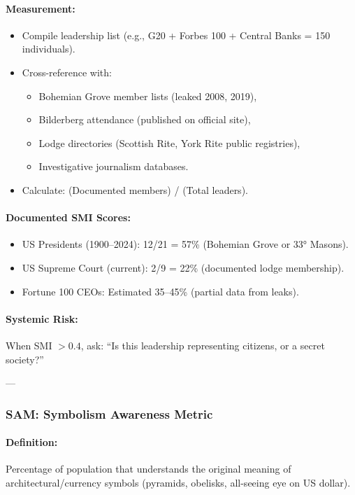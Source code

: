 \documentclass[11pt,a4paper]{article}
\theoremstyle{definition}
\theoremstyle{remark}
\begin{document}
\paragraph{Measurement:}
\begin{itemize}
\item Compile leadership list (e.g., G20 + Forbes 100 + Central Banks = 150 individuals).
\item Cross-reference with:
  \begin{itemize}
  \item Bohemian Grove member lists (leaked 2008, 2019),
  \item Bilderberg attendance (published on official site),
  \item Lodge directories (Scottish Rite, York Rite public registries),
  \item Investigative journalism databases.
  \end{itemize}
\item Calculate: (Documented members) / (Total leaders).
\end{itemize}

\paragraph{Documented SMI Scores:}
\begin{itemize}
\item US Presidents (1900–2024): 12/21 = 57\% (Bohemian Grove or 33° Masons).
\item US Supreme Court (current): 2/9 = 22\% (documented lodge membership).
\item Fortune 100 CEOs: Estimated 35–45\% (partial data from leaks).
\end{itemize}

\paragraph{Systemic Risk:}
When SMI $> 0.4$, ask: ``Is this leadership representing citizens, or a secret society?''

---

\subsubsection{SAM: Symbolism Awareness Metric}

\paragraph{Definition:}
Percentage of population that understands the original meaning of architectural/currency symbols (pyramids, obelisks, all-seeing eye on US dollar).
\end{document}
